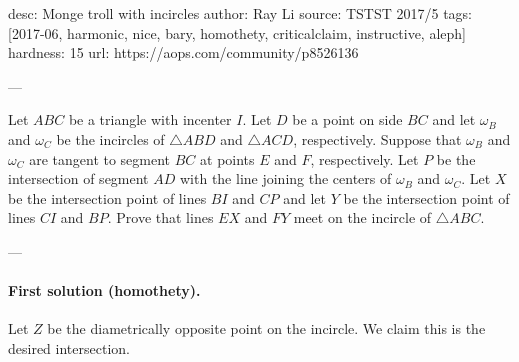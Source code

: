 desc: Monge troll with incircles
author: Ray Li
source: TSTST 2017/5
tags: [2017-06, harmonic, nice, bary, homothety, criticalclaim, instructive, aleph]
hardness: 15
url: https://aops.com/community/p8526136

---

Let $ABC$ be a triangle with incenter $I$.
Let $D$ be a point on side $BC$ and let $\omega_B$ and $\omega_C$
be the incircles of $\triangle ABD$ and $\triangle ACD$, respectively.
Suppose that $\omega_B$ and $\omega_C$ are tangent to segment $BC$
at points $E$ and $F$, respectively.
Let $P$ be the intersection of segment $AD$ with the
line joining the centers of $\omega_B$ and $\omega_C$.
Let $X$ be the intersection point of lines $BI$ and $CP$
and let $Y$ be the intersection point of lines $CI$ and $BP$.
Prove that lines $EX$ and $FY$ meet on the incircle of $\triangle ABC$.

---

\paragraph{First solution (homothety).}
Let $Z$ be the diametrically opposite point on the incircle.
We claim this is the desired intersection.

